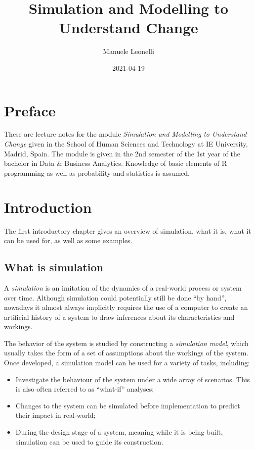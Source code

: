 \documentclass[
]{book}
\title{Simulation and Modelling to Understand Change}
\author{Manuele Leonelli}
\date{2021-04-19}
\begin{document}
\maketitle

{
\setcounter{tocdepth}{1}
\tableofcontents
}
\hypertarget{preface}{%
\chapter*{Preface}\label{preface}}

These are lecture notes for the module \emph{Simulation and Modelling to Understand Change} given in the School of Human Sciences and Technology at IE University, Madrid, Spain. The module is given in the 2nd semester of the 1st year of the bachelor in Data \& Business Analytics. Knowledge of basic elements of R programming as well as probability and statistics is assumed.

\hypertarget{intro}{%
\chapter{Introduction}\label{intro}}

The first introductory chapter gives an overview of simulation, what it is, what it can be used for, as well as some examples.

\hypertarget{what-is-simulation}{%
\section{What is simulation}\label{what-is-simulation}}

A \emph{simulation} is an imitation of the dynamics of a real-world process or system over time. Although simulation could potentially still be done ``by hand'', nowadays it almost always implicitly requires the use of a computer to create an artificial history of a system to draw inferences about its characteristics and workings.

The behavior of the system is studied by constructing a \emph{simulation model}, which usually takes the form of a set of assumptions about the workings of the system. Once developed, a simulation model can be used for a variety of tasks, including:

\begin{itemize}
\item
  Investigate the behaviour of the system under a wide array of scenarios. This is also often referred to as ``what-if'' analyses;
\item
  Changes to the system can be simulated before implementation to predict their impact in real-world;
\item
  During the design stage of a system, meaning while it is being built, simulation can be used to guide its construction.
\end{itemize}
\end{document}
